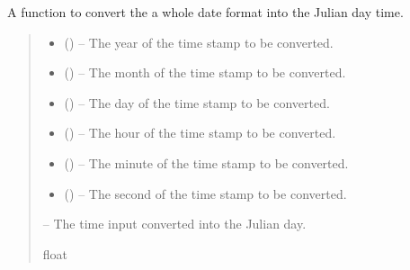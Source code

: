 \documentclass[letterpaper,11pt,english]{sphinxmanual}
\begin{document}
\begin{savenotes}\begin{fulllineitems}
\label{\detokenize{code/opihiexarata.library.conversion:opihiexarata.library.conversion.full_date_to_julian_day}}
\pysigstartsignatures
{}
\pysigstopsignatures
\sphinxAtStartPar
A function to convert the a whole date format into the Julian day time.
\begin{quote}\begin{description}
\begin{itemize}
\item {} 
\sphinxAtStartPar
{} () – The year of the time stamp to be converted.

\item {} 
\sphinxAtStartPar
{} () – The month of the time stamp to be converted.

\item {} 
\sphinxAtStartPar
{} () – The day of the time stamp to be converted.

\item {} 
\sphinxAtStartPar
{} () – The hour of the time stamp to be converted.

\item {} 
\sphinxAtStartPar
{} () – The minute of the time stamp to be converted.

\item {} 
\sphinxAtStartPar
{} () – The second of the time stamp to be converted.

\end{itemize}

\sphinxAtStartPar
{} – The time input converted into the Julian day.

\sphinxAtStartPar
float

\end{description}\end{quote}

\end{fulllineitems}\end{savenotes}
\end{document}
